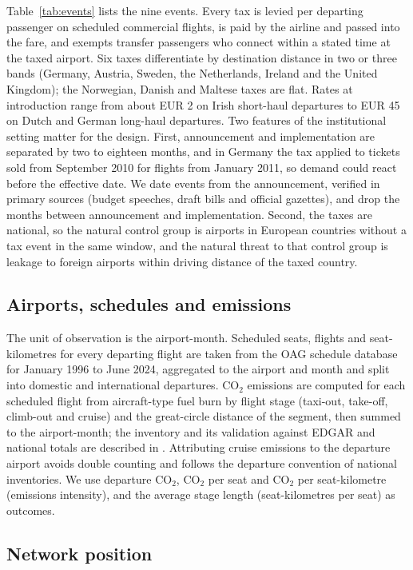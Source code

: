 Table~\ref{tab:events} lists the nine events. Every tax is levied per departing passenger on scheduled
commercial flights, is paid by the airline and passed into the fare, and exempts transfer passengers
who connect within a stated time at the taxed airport. Six taxes differentiate by destination distance
in two or three bands (Germany, Austria, Sweden, the Netherlands, Ireland and the United Kingdom); the
Norwegian, Danish and Maltese taxes are flat. Rates at introduction range from about EUR 2 on Irish
short-haul departures to EUR 45 on Dutch and German long-haul departures. Two features of the
institutional setting matter for the design. First, announcement and implementation are separated by
two to eighteen months, and in Germany the tax applied to tickets sold from September 2010 for flights
from January 2011, so demand could react before the effective date. We date events from the
announcement, verified in primary sources (budget speeches, draft bills and official gazettes), and
drop the months between announcement and implementation. Second, the taxes are national, so the
natural control group is airports in European countries without a tax event in the same window, and
the natural threat to that control group is leakage to foreign airports within driving distance of the
taxed country.

\subsection{Airports, schedules and emissions}

The unit of observation is the airport-month. Scheduled seats, flights and seat-kilometres for every
departing flight are taken from the OAG schedule database for January 1996 to June 2024, aggregated to
the airport and month and split into domestic and international departures. CO$_2$ emissions are
computed for each scheduled flight from aircraft-type fuel burn by flight stage (taxi-out, take-off,
climb-out and cruise) and the great-circle distance of the segment, then summed to the airport-month;
the inventory and its validation against EDGAR and national totals are described in
\citet{yoo2026co2}. Attributing cruise emissions to the departure airport avoids double counting and
follows the departure convention of national inventories. We use departure CO$_2$, CO$_2$ per seat and
CO$_2$ per seat-kilometre (emissions intensity), and the average stage length (seat-kilometres per
seat) as outcomes.

\subsection{Network position}

